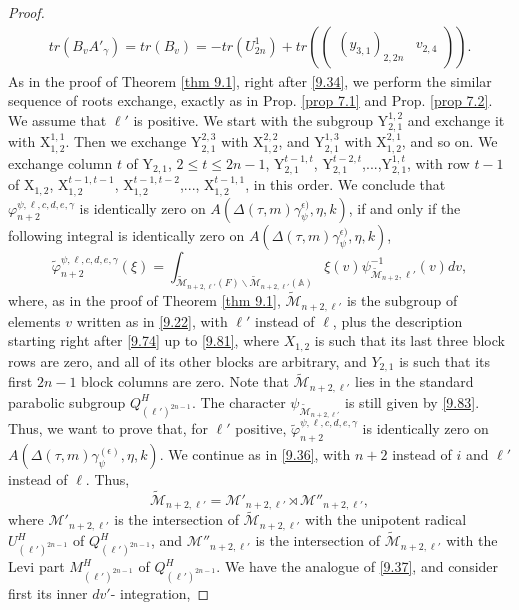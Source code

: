 \documentclass[12pts]{amsart}
\newcommand{\BA}{{\mathbb {A}}}
\begin{document}
\begin{proof}
\begin{multline}
tr(B_v A'_\gamma)=tr(B_v)=-tr(U_{2n}^1)+tr(\begin{pmatrix}(y_{3,1})_{2,2n}&v_{2,4}\end{pmatrix}).
\end{multline}
As in the proof of Theorem \ref{thm 9.1}, right after \eqref{9.34}, we perform the similar sequence of roots exchange, exactly as in Prop. \ref{prop 7.1} and Prop. \ref{prop 7.2}. We assume that $\ell'$ is positive. We start with the subgroup $\mathrm{Y}_{2,1}^{1,2}$ and exchange it with $\mathrm{X}_{1,2}^{1,1}$. Then we exchange $\mathrm{Y}_{2,1}^{2,3}$ with $\mathrm{X}_{1,2}^{2,2}$, and $\mathrm{Y}_{2,1}^{1,3}$ with $\mathrm{X}_{1,2}^{2,1}$, and so on. We exchange column $t$ of $\mathrm{Y}_{2,1}$, $2\leq t\leq 2n-1$, $\mathrm{Y}_{2,1}^{t-1,t}$, $\mathrm{Y}_{2,1}^{t-2,t}$,...,$\mathrm{Y}_{2,1}^{1,t}$, with row $t-1$ of $\mathrm{X}_{1,2}$, $\mathrm{X}_{1,2}^{t-1,t-1}$, $\mathrm{X}_{1,2}^{t-1,t-2}$,..., $\mathrm{X}_{1,2}^{t-1,1}$, in this order. We conclude that $\varphi_{n+2}^{\psi,\ell,c,d,e,\gamma}$ is identically zero on $A(\Delta(\tau,m)\gamma_\psi^{\epsilon)},\eta,k)$, if and only if the following integral is identically zero on $A(\Delta(\tau,m)\gamma_\psi^{\epsilon)},\eta,k)$, 
\begin{equation}\label{9.84}
\tilde{\varphi}_{n+2}^{\psi,\ell,c,d,e,\gamma}(\xi)=
\int_{\tilde{\mathcal{M}}_{n+2,\ell'}(F)\backslash
	\tilde{\mathcal{M}}_{n+2,\ell'}(\BA)}\xi(v)\psi^{-1}_{\tilde{\mathcal{M}}_{n+2},\ell'}(v)dv, 
\end{equation}
where, as in the proof of Theorem \ref{thm 9.1}, $\tilde{\mathcal{M}}_{n+2,\ell'}$ is the subgroup of elements $v$ written as in \eqref{9.22}, with $\ell'$ instead of $\ell$, plus the description starting right after \eqref{9.74} up to \eqref{9.81}, where $X_{1,2}$ is such that its last three block rows are zero, and all of its other blocks are arbitrary, and $Y_{2,1}$ is such that its first $2n-1$ block columns are zero. Note that $\tilde{\mathcal{M}}_{n+2,\ell'}$ lies in the standard parabolic subgroup $Q^H_{(\ell')^{2n-1}}$.  The character $\psi_{\tilde{\mathcal{M}}_{n+2,\ell'}}$ is still given by \eqref{9.83}. Thus, we want to prove that, for $\ell'$ positive, $\tilde{\varphi}_{n+2}^{\psi,\ell,c,d,e,\gamma}$ is identically zero on $A(\Delta(\tau,m)\gamma_\psi^{(\epsilon)},\eta,k)$. We continue as in \eqref{9.36}, with $n+2$ instead of $i$ and $\ell'$ instead of $\ell$. Thus,
$$
\tilde{\mathcal{M}}_{n+2,\ell'}=\mathcal{M}'_{n+2,\ell'}\rtimes\mathcal{M}''_{n+2,\ell'},
$$
where $\mathcal{M}'_{n+2,\ell'}$ is the intersection of $\tilde{\mathcal{M}}_{n+2,\ell'}$ with the unipotent radical $U^H_{(\ell')^{2n-1}}$ of $Q^H_{(\ell')^{2n-1}}$, and $\mathcal{M}''_{n+2,\ell'}$ is the intersection of $\tilde{\mathcal{M}}_{n+2,\ell'}$ with the Levi part $M^H_{(\ell')^{2n-1}}$ of $Q^H_{(\ell')^{2n-1}}$. We have the analogue of \eqref{9.37}, and consider first its inner $dv'$- integration, 

\end{proof}
\end{document}
